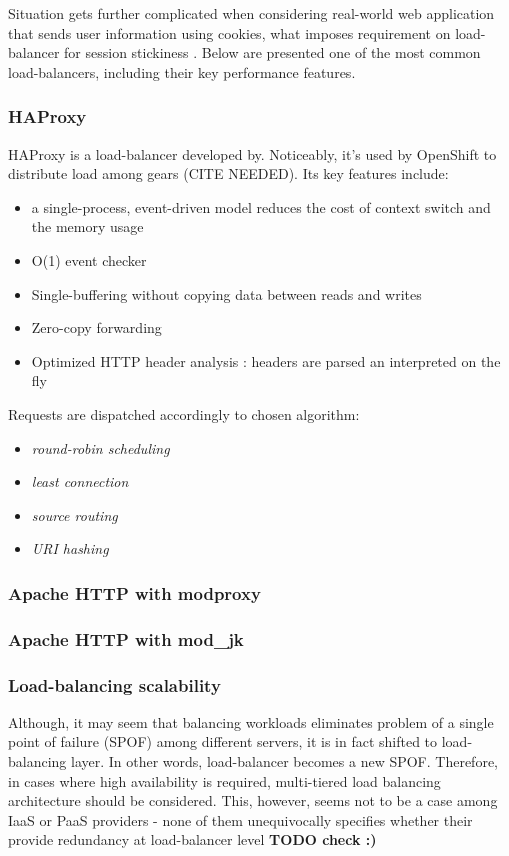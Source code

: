 Situation gets further complicated when considering real-world web application that sends user information using cookies, what imposes requirement on load-balancer for session stickiness \cite{StBaMa11}. Below are presented one of the most common load-balancers, including their key performance features.

\subsubsection*{HAProxy}

HAProxy \cite{HAProxy} is a load-balancer developed by. Noticeably, it's used by OpenShift \cite{OpenShift} to distribute load among gears (CITE NEEDED). Its key features include:
\begin{itemize}
	\item a single-process, event-driven model reduces the cost of context switch and the memory usage
	\item O(1) event checker
	\item Single-buffering without copying data between reads and writes
	\item Zero-copy forwarding
	\item Optimized HTTP header analysis : headers are parsed an interpreted on the fly
\end{itemize}

Requests are dispatched accordingly to chosen algorithm:
\begin{itemize}
 \item \textit{round-robin scheduling}
 \item \textit{least connection}
 \item \textit{source routing}
 \item \textit{URI hashing}
\end{itemize}

\subsubsection*{Apache HTTP with modproxy}

\subsubsection*{Apache HTTP with mod_jk}

\subsubsection{Load-balancing scalability}
Although, it may seem that balancing workloads eliminates problem of a single point of failure (SPOF) among different servers, it is in fact shifted to load-balancing layer. In other words, load-balancer becomes a new SPOF. Therefore, in cases where high availability is required, multi-tiered load balancing architecture should be considered. This, however, seems not to be a case among IaaS or PaaS providers - none of them unequivocally specifies whether their provide redundancy at load-balancer level \textbf{TODO check :)}

